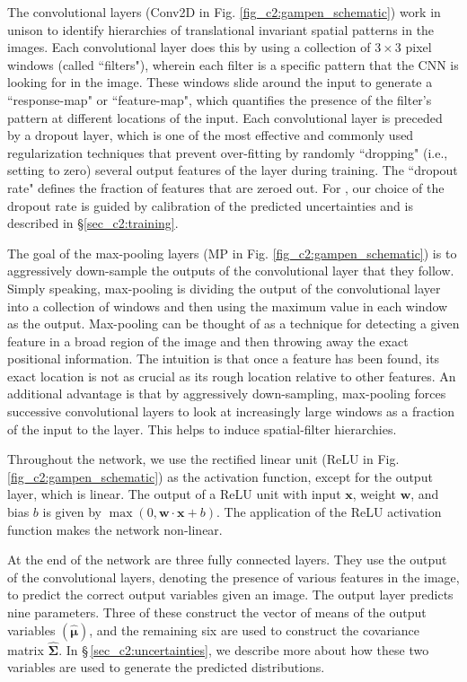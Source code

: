 The convolutional layers (Conv2D in Fig. \ref{fig_c2:gampen_schematic}) work in unison to identify hierarchies of translational invariant spatial patterns in the images. Each convolutional layer does this by using a collection of $3\times3$ pixel windows (called ``filters"), wherein each filter is a specific pattern that the CNN is looking for in the image. These windows slide around the input to generate a ``response-map" or ``feature-map", which quantifies the presence of the filter's pattern at different locations of the input. Each convolutional layer is preceded by a dropout layer, which is one of the most effective and commonly used regularization techniques that prevent over-fitting by randomly ``dropping" (i.e., setting to zero) several output features of the layer during training. The ``dropout rate" defines the fraction of features that are zeroed out. For \gampen{}, our choice of the dropout rate is guided by calibration of the predicted uncertainties and is described in \S \ref{sec_c2:training}.

The goal of the max-pooling layers (MP in Fig. \ref{fig_c2:gampen_schematic}) is to aggressively down-sample the outputs of the convolutional layer that they follow. Simply speaking, max-pooling is dividing the output of the convolutional layer into a collection of windows and then using the maximum value in each window as the output. Max-pooling can be thought of as a technique for detecting a given feature in a broad region of the image and then throwing away the exact positional information. The intuition is that once a feature has been found, its exact location is not as crucial as its rough location relative to other features. An additional advantage is that by aggressively down-sampling, max-pooling forces successive convolutional layers to look at increasingly large windows as a fraction of the input to the layer. This helps to induce spatial-filter hierarchies. 

Throughout the network, we use the rectified linear unit (ReLU in Fig. \ref{fig_c2:gampen_schematic}) as the activation function, except for the output layer, which is linear. The output of a ReLU unit with input $\mathbf{x}$, weight $\mathbf{w}$, and bias $b$ is given by $\max (0, \boldsymbol{w} \cdot \boldsymbol{x}+b)$. The application of the ReLU activation function makes the network non-linear. 

At the end of the network are three fully connected layers. They use the output of the convolutional layers, denoting the presence of various features in the image, to predict the correct output variables given an image. The output layer predicts nine parameters. Three of these construct the vector of means of the output variables $(\boldsymbol{\hat{\mu}})$, and the remaining six are used to construct the covariance matrix $\boldsymbol{\hat{\Sigma}}$. In \S\,\ref{sec_c2:uncertainties}, we describe more about how these two variables are used to generate the predicted distributions.

